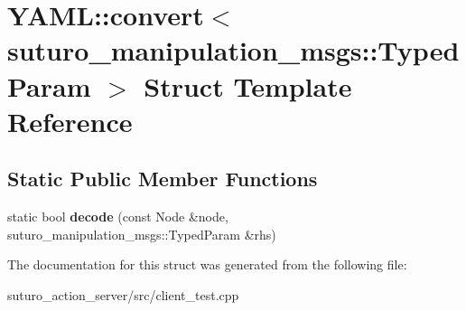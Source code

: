 \hypertarget{structYAML_1_1convert_3_01suturo__manipulation__msgs_1_1TypedParam_01_4}{\section{Y\-A\-M\-L\-:\-:convert$<$ suturo\-\_\-manipulation\-\_\-msgs\-:\-:Typed\-Param $>$ Struct Template Reference}
\label{structYAML_1_1convert_3_01suturo__manipulation__msgs_1_1TypedParam_01_4}
}
\subsection*{Static Public Member Functions}
\begin{DoxyCompactItemize}
\item 
\hypertarget{structYAML_1_1convert_3_01suturo__manipulation__msgs_1_1TypedParam_01_4_a7c877e63fa7c84e896a9751e347818c4}{static bool {\bfseries decode} (const Node \&node, suturo\-\_\-manipulation\-\_\-msgs\-::\-Typed\-Param \&rhs)}\label{structYAML_1_1convert_3_01suturo__manipulation__msgs_1_1TypedParam_01_4_a7c877e63fa7c84e896a9751e347818c4}

\end{DoxyCompactItemize}


The documentation for this struct was generated from the following file\-:\begin{DoxyCompactItemize}
\item 
suturo\-\_\-action\-\_\-server/src/client\-\_\-test.\-cpp\end{DoxyCompactItemize}
